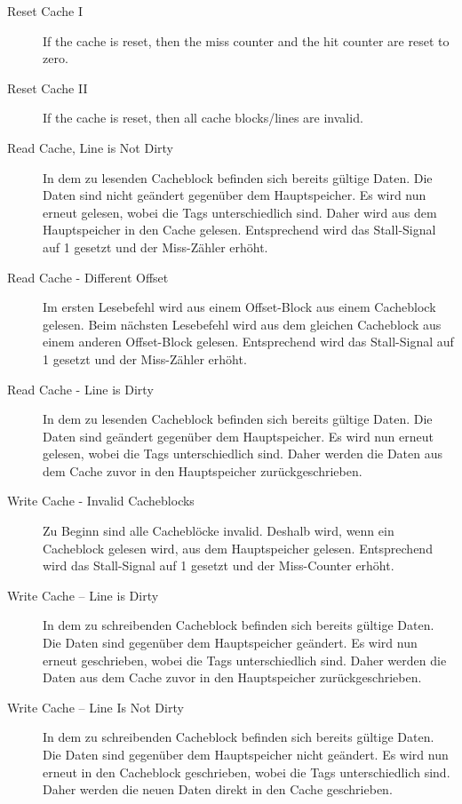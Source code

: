 \begin{description}
	\item[Reset Cache I] If the cache is reset, then the miss counter and the hit counter are reset to zero.
	\item[Reset Cache II] If the cache is reset, then all cache blocks/lines are invalid.
	
	\item[Read Cache, Line is Not Dirty] In dem zu lesenden Cacheblock befinden sich bereits gültige Daten. Die Daten sind nicht geändert gegenüber dem Hauptspeicher. Es wird nun erneut gelesen, wobei die Tags unterschiedlich sind. Daher wird aus dem Hauptspeicher in den Cache gelesen. Entsprechend wird das Stall-Signal auf 1 gesetzt und der Miss-Zähler erhöht.
\item[Read Cache - Different Offset] Im ersten Lesebefehl wird aus einem Offset-Block aus einem Cacheblock gelesen. Beim nächsten Lesebefehl wird aus dem gleichen Cacheblock aus einem anderen Offset-Block gelesen. Entsprechend wird das Stall-Signal auf 1 gesetzt und der Miss-Zähler erhöht.
\item[Read Cache - Line is Dirty] In dem zu lesenden Cacheblock befinden sich bereits gültige Daten. Die Daten sind geändert gegenüber dem Hauptspeicher. Es wird nun erneut gelesen, wobei die Tags unterschiedlich sind. Daher werden die Daten aus dem Cache zuvor in den Hauptspeicher zurückgeschrieben.
\item[Write Cache - Invalid Cacheblocks] Zu Beginn sind alle Cacheblöcke invalid. Deshalb wird, wenn ein Cacheblock gelesen wird, aus dem Hauptspeicher gelesen. Entsprechend wird das Stall-Signal auf 1 gesetzt und der Miss-Counter erhöht.
\item[Write Cache – Line is Dirty] In dem zu schreibenden Cacheblock befinden sich bereits gültige Daten. Die Daten sind gegenüber dem Hauptspeicher geändert. Es wird nun erneut geschrieben, wobei die Tags unterschiedlich sind. Daher werden die Daten aus dem Cache zuvor in den Hauptspeicher zurückgeschrieben.
\item[Write Cache – Line Is Not Dirty] In dem zu schreibenden Cacheblock befinden sich bereits gültige Daten. Die Daten sind gegenüber dem Hauptspeicher nicht geändert. Es wird nun erneut in den Cacheblock geschrieben, wobei die Tags unterschiedlich sind. Daher werden die neuen Daten direkt in den Cache geschrieben.

\end{description}
